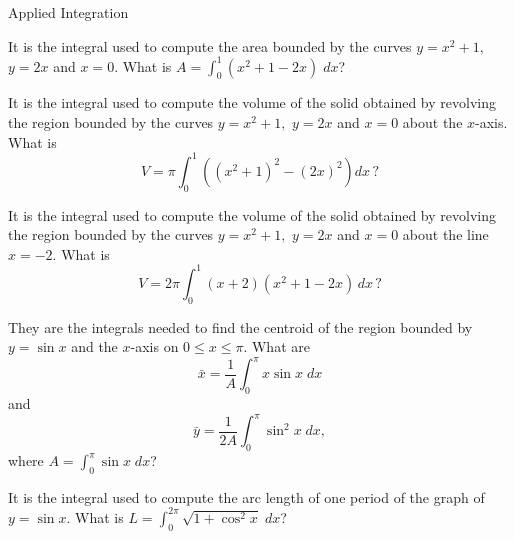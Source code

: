 \documentclass{article}
\begin{document}
\begin{category}{Applied Integration}

  \begin{clue}[write]
    It is the integral used to compute the area bounded by the curves
    $y=x^2+1,$ $y=2x$ and $x=0.$
  \response
    What is $\displaystyle A=\int_0^1 (x^2+1-2x)\; dx$?
  \end{clue}

  \begin{clue}[write]
    It is the integral used to compute the volume of the solid obtained by
    revolving the region bounded by the curves $y=x^2+1,$ $y=2x$ and $x=0$
    about the $x$-axis.
  \response
    What is
    \[V=\pi\int_0^1 \left((x^2+1)^2-(2x)^2\right) dx\,?\]
  \end{clue}

  \begin{clue}
    It is the integral used to compute the volume of the solid obtained by
    revolving the region bounded by the curves $y=x^2+1,$ $y=2x$ and $x=0$
    about the line $x=-2.$
  \response
    What is
    \[V=2\pi\int_0^1 (x+2)(x^2+1-2x)\, dx\,?\]
  \end{clue}

  \begin{clue}[write]
    They are the integrals needed to find the centroid of the region bounded
    by $y=\sin x$ and the $x$-axis on $0\le x\le \pi.$
  \response
    What are
    \[\bar x=\frac{1}{A}\int_{0}^{\pi}x\sin x\; dx\]
    and
    \[\bar y=\frac{1}{2A}\int_{0}^{\pi}\sin^{2}x\;dx,\]
    where $\displaystyle A=\int_{0}^{\pi}\sin x\; dx$?
  \end{clue}

  \begin{clue}[write]
    It is the integral used to compute the arc length of one period of the
    graph of $y=\sin x.$
  \response
    What is $\displaystyle L=\int_0^{2\pi}\sqrt{1+\cos^2 x}\; dx$?
  \end{clue}

\end{category}
\end{document}
